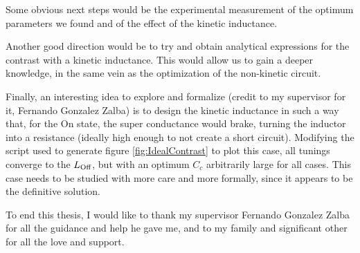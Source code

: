 \documentclass[../main.tex]{subfiles}
\begin{document}
Some obvious next steps would be the experimental measurement of
the optimum parameters we found and of the effect of the kinetic inductance.

Another good direction would be to try and obtain analytical expressions for
the contrast with a kinetic inductance. This would allow us to gain a deeper
knowledge, in the same vein as the optimization of the non-kinetic circuit.

Finally, an interesting idea to explore and formalize (credit to my supervisor for it,
Fernando Gonzalez Zalba) is to design the kinetic inductance in such a way that,
for the On state, the super conductance would brake, turning the inductor into a
resistance (ideally high enough to not create a short circuit).
Modifying the script used to generate figure \ref{fig:IdealContrast}
to plot this case, all tunings converge to the \(L_{\text{Off}}\), but with an
optimum \(C_{c}\) arbitrarily large for all cases. This case needs to be
studied with more care and more formally, since it appears to be the definitive
solution.

To end this thesis, I would like to thank my supervisor Fernando Gonzalez Zalba
for all the guidance and help he gave me, and to my family and significant
other for all the love and support.
\end{document}
